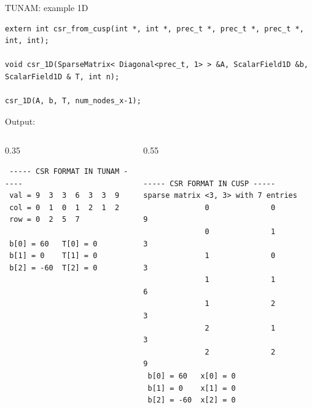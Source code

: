 \documentclass[handout]{beamer}
\begin{document}
\begin{frame}[fragile]{TUNAM: example 1D}

\begin{tiny}

\begin{lstlisting}
extern int csr_from_cusp(int *, int *, prec_t *, prec_t *, prec_t *, int, int);

void csr_1D(SparseMatrix< Diagonal<prec_t, 1> > &A, ScalarField1D &b, ScalarField1D & T, int n);
		   
csr_1D(A, b, T, num_nodes_x-1);	   
\end{lstlisting}

Output:

\begin{columns}
\begin{column}{0.35\textwidth}

\begin{verbatim}
 ----- CSR FORMAT IN TUNAM ----- 
 val = 9  3  3  6  3  3  9  
 col = 0  1  0  1  2  1  2  
 row = 0  2  5  7  

 b[0] = 60	 T[0] = 0
 b[1] = 0	 T[1] = 0
 b[2] = -60	 T[2] = 0
\end{verbatim}

\end{column}
\begin{column}{0.55\textwidth}

\begin{verbatim}

----- CSR FORMAT IN CUSP ----- 
sparse matrix <3, 3> with 7 entries
              0              0              9
              0              1              3
              1              0              3
              1              1              6
              1              2              3
              2              1              3
              2              2              9
 b[0] = 60	 x[0] = 0
 b[1] = 0	 x[1] = 0
 b[2] = -60	 x[2] = 0 
\end{verbatim}

\end{column}
\end{columns}

\end{tiny}


\end{frame}
\end{document}
